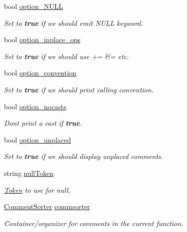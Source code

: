\begin{DoxyCompactItemize}
\item 
bool \mbox{\hyperlink{class_print_c_a3c9c17128122dfdad309f994fe2f3864}{option\+\_\+\+N\+U\+LL}}
\begin{DoxyCompactList}\small\item\em Set to {\bfseries{true}} if we should emit N\+U\+LL keyword. \end{DoxyCompactList}\item 
bool \mbox{\hyperlink{class_print_c_a71501a4855f612214c23eb5d9ae584ae}{option\+\_\+inplace\+\_\+ops}}
\begin{DoxyCompactList}\small\item\em Set to {\bfseries{true}} if we should use \textquotesingle{}+=\textquotesingle{} \textquotesingle{}\&=\textquotesingle{} etc. \end{DoxyCompactList}\item 
bool \mbox{\hyperlink{class_print_c_aa95a4d17b93d7d1f2cf29d013613a5ad}{option\+\_\+convention}}
\begin{DoxyCompactList}\small\item\em Set to {\bfseries{true}} if we should print calling convention. \end{DoxyCompactList}\item 
bool \mbox{\hyperlink{class_print_c_af2d3e095bea7152010bc849ec310525f}{option\+\_\+nocasts}}
\begin{DoxyCompactList}\small\item\em Don\textquotesingle{}t print a cast if {\bfseries{true}}. \end{DoxyCompactList}\item 
bool \mbox{\hyperlink{class_print_c_a8186b352ba2ddb4fa4623b23079e018d}{option\+\_\+unplaced}}
\begin{DoxyCompactList}\small\item\em Set to {\bfseries{true}} if we should display unplaced comments. \end{DoxyCompactList}\item 
string \mbox{\hyperlink{class_print_c_a1bf3bef78d048160d91639467b0c9278}{null\+Token}}
\begin{DoxyCompactList}\small\item\em \mbox{\hyperlink{class_token}{Token}} to use for \textquotesingle{}null\textquotesingle{}. \end{DoxyCompactList}\item 
\mbox{\hyperlink{class_comment_sorter}{Comment\+Sorter}} \mbox{\hyperlink{class_print_c_a3092383bb59a303a37820b33ddc02183}{commsorter}}
\begin{DoxyCompactList}\small\item\em Container/organizer for comments in the current function. \end{DoxyCompactList}\end{DoxyCompactItemize}
